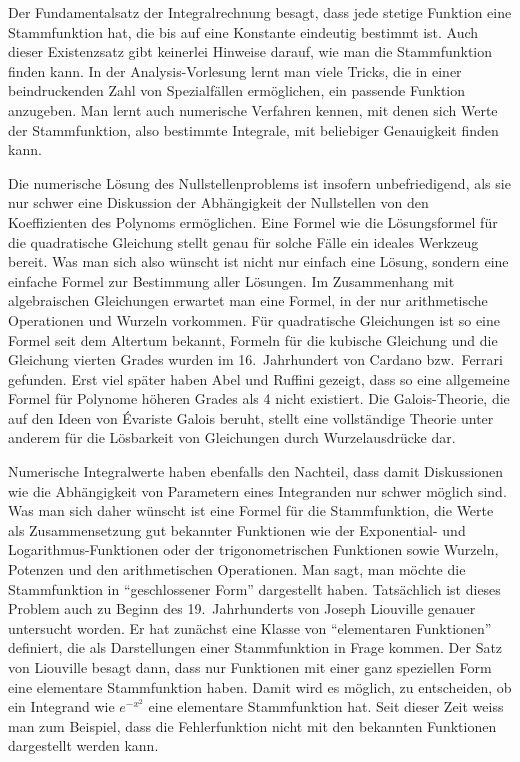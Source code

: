 Der Fundamentalsatz der Integralrechnung besagt, dass jede stetige 
Funktion eine Stammfunktion hat, die bis auf eine Konstante eindeutig
bestimmt ist.
Auch dieser Existenzsatz gibt keinerlei Hinweise darauf, wie man die
Stammfunktion finden kann.
In der Analysis-Vorlesung lernt man viele Tricks, die in einer
beindruckenden Zahl von Spezialfällen ermöglichen, ein passende
Funktion anzugeben.
Man lernt auch numerische Verfahren kennen, mit denen sich Werte der
Stammfunktion, also bestimmte Integrale, mit beliebiger Genauigkeit
finden kann.

Die numerische Lösung des Nullstellenproblems ist insofern unbefriedigend,
als sie nur schwer eine Diskussion der Abhängigkeit der Nullstellen von
den Koeffizienten des Polynoms ermöglichen.
Eine Formel wie die Lösungsformel für die quadratische Gleichung 
stellt genau für solche Fälle ein ideales Werkzeug bereit.
Was man sich also wünscht ist nicht nur einfach eine Lösung, sondern eine
einfache Formel zur Bestimmung aller Lösungen.
Im Zusammenhang mit algebraischen Gleichungen erwartet man eine Formel,
in der nur arithmetische Operationen und Wurzeln vorkommen.
Für quadratische Gleichungen ist so eine Formel seit dem Altertum bekannt,
Formeln für die kubische Gleichung und die Gleichung vierten Grades wurden
im 16.~Jahrhundert von Cardano bzw.~Ferrari gefunden.
Erst viel später haben Abel und Ruffini gezeigt, dass so eine allgemeine
Formel für Polynome höheren Grades als 4 nicht existiert.
Die Galois-Theorie, die auf den Ideen von Évariste Galois beruht, 
stellt eine vollständige Theorie unter anderem für die Lösbarkeit
von Gleichungen durch Wurzelausdrücke dar.

Numerische Integralwerte haben ebenfalls den Nachteil, dass damit
Diskussionen wie die Abhängigkeit von Parametern eines Integranden
nur schwer möglich sind.
Was man sich daher wünscht ist eine Formel für die Stammfunktion,
die Werte als Zusammensetzung gut bekannter Funktionen wie der Exponential-
und Logarithmus-Funktionen oder der trigonometrischen Funktionen
sowie Wurzeln, Potenzen und den arithmetischen Operationen.
Man sagt, man möchte die Stammfunktion in ``geschlossener Form'' 
dargestellt haben.
Tatsächlich ist dieses Problem auch zu Beginn des 19.~Jahrhunderts
von Joseph Liouville genauer untersucht worden.
Er hat zunächst eine Klasse von ``elementaren Funktionen'' definiert,
die als Darstellungen einer Stammfunktion in Frage kommen.
Der Satz von Liouville besagt dann, dass nur Funktionen mit einer
ganz speziellen Form eine elementare Stammfunktion haben.
Damit wird es möglich, zu entscheiden, ob ein Integrand wie $e^{-x^2}$ 
eine elementare Stammfunktion hat.
Seit dieser Zeit weiss man zum Beispiel, dass die Fehlerfunktion nicht
mit den bekannten Funktionen dargestellt werden kann.

